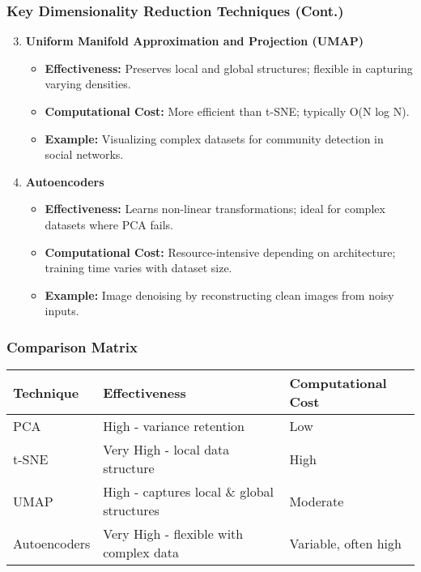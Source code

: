 \documentclass[aspectratio=169]{beamer}
\begin{document}
\begin{frame}[fragile]
    \frametitle{Key Dimensionality Reduction Techniques (Cont.)}
    \begin{enumerate}
        \setcounter{enumi}{2}
        \item \textbf{Uniform Manifold Approximation and Projection (UMAP)}
            \begin{itemize}
                \item \textbf{Effectiveness:} Preserves local and global structures; flexible in capturing varying densities.
                \item \textbf{Computational Cost:} More efficient than t-SNE; typically O(N log N).
                \item \textbf{Example:} Visualizing complex datasets for community detection in social networks.
            \end{itemize}
        
        \item \textbf{Autoencoders}
            \begin{itemize}
                \item \textbf{Effectiveness:} Learns non-linear transformations; ideal for complex datasets where PCA fails.
                \item \textbf{Computational Cost:} Resource-intensive depending on architecture; training time varies with dataset size.
                \item \textbf{Example:} Image denoising by reconstructing clean images from noisy inputs.
            \end{itemize}
    \end{enumerate}
\end{frame}

\begin{frame}[fragile]
    \frametitle{Comparison Matrix}
    \begin{table}[]
        \centering
        \begin{tabular}{|l|l|l|}
            \hline
            \textbf{Technique}  & \textbf{Effectiveness}                             & \textbf{Computational Cost} \\ \hline
            PCA                 & High - variance retention                          & Low                         \\ \hline
            t-SNE               & Very High - local data structure                  & High                        \\ \hline
            UMAP                & High - captures local \& global structures       & Moderate                    \\ \hline
            Autoencoders        & Very High - flexible with complex data            & Variable, often high        \\ \hline
        \end{tabular}
    \end{table}
\end{frame}
\end{document}
